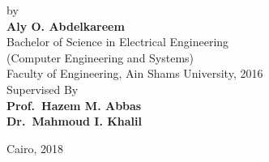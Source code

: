 \begin{center}
\vfill
\small
by\\
\large
\textbf{Aly O. Abdelkareem}\\
\small
Bachelor of Science in Electrical Engineering  \\
(Computer Engineering and Systems)\\
Faculty of Engineering, Ain Shams University, 2016\\







\vfill
\small
Supervised By\\
\normalsize
\textbf{Prof.~Hazem M. Abbas\\
	  Dr.~Mahmoud I. Khalil}

\vfill
\small
Cairo, 2018\\

\end{center}
